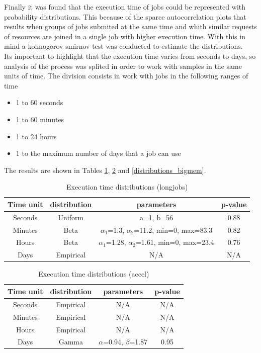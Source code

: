 \documentclass{wscpaperproc}
\begin{document}
Finally it was found that the execution time of jobs could be represented with
probability distributions. This because of the sparce autocorrelation plots that
results when groups of jobs submited at the same time and
whith similar requests of resources are joined in a single job with higher
execution time. With this in mind a kolmogorov smirnov test was conducted to
estimate the distributions. \\

Its important to highlight that the execution time varies from seconds to days,
so analysis of the process was splited in order to work with samples in the same
units of time. The division consists in work with jobs in the following ranges
of time

\begin{itemize}
    \item 1 to 60 seconds
    \item 1 to 60 minutes
    \item 1 to 24 hours
    \item 1 to the maximum number of days that a job can use
\end{itemize}

The results are shown in Tables \ref{distributions_longjobs},
\ref{distributions_accel} and \ref{distributions_bigmem}.

\begin{table}[h!]
    \centering
    \begin{tabular}{ | c | c | c | c |}
        \hline
        \textbf{Time unit} & \textbf{distribution} & \textbf{parameters} & \textbf{p-value} \\
        \hline
        Seconds & Uniform & a=1, b=56 & 0.88 \\
        \hline
        Minutes & Beta & $\alpha_1$=1.3, $\alpha_2$=11.2, min=0, max=83.3 & 0.82 \\
        \hline
        Hours & Beta & $\alpha_1$=1.28, $\alpha_2$=1.61, min=0, max=23.4 & 0.76 \\
        \hline
        Days & Empirical & N/A & N/A \\
        \hline
    \end{tabular}
    \caption{Execution time distributions (longjobs)}
    \label{distributions_longjobs}
\end{table}

\begin{table}[h!]
    \centering
    \begin{tabular}{ | c | c | c | c |}
        \hline
        \textbf{Time unit} & \textbf{distribution} & \textbf{parameters} & \textbf{p-value} \\
        \hline
        Seconds & Empirical & N/A & N/A \\
        \hline
        Minutes & Empirical & N/A & N/A \\
        \hline
        Hours & Empirical & N/A & N/A \\
        \hline
        Days & Gamma & $\alpha$=0.94, $\beta$=1.87 & 0.95 \\
        \hline
    \end{tabular}
    \caption{Execution time distributions (accel)}
    \label{distributions_accel}
\end{table}
\end{document}
